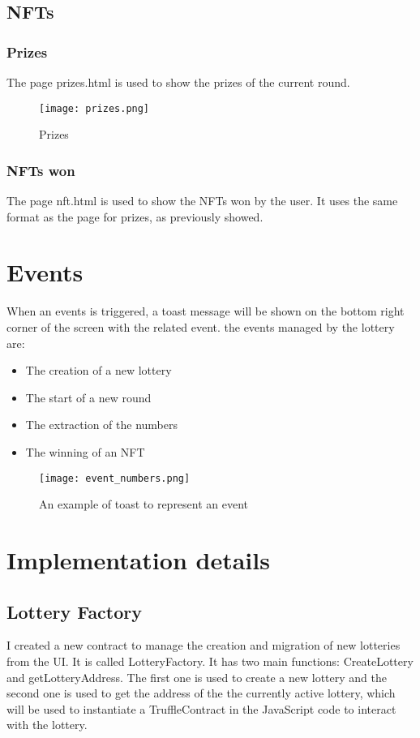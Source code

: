 \documentclass[11pt]{article}
\begin{document}
\subsection{NFTs}
\subsubsection*{Prizes}
The page prizes.html is used to show the prizes of the current round.
\begin{figure}[h!]
\centering
\texttt{[image: prizes.png]}
\caption{Prizes}
\label{fig:prizes}
\end{figure}

\subsubsection*{NFTs won}
The page nft.html is used to show the NFTs won by the user. It uses the
same format as the page for prizes, as previously showed.
\section{Events}
When an events is triggered, a toast message will be shown on the bottom right corner of the screen
with the related event.
the events managed by the lottery are:
\begin{itemize}
\item The creation of a new lottery
\item The start of a new round
\item The extraction of the numbers
\item The winning of an NFT
\end{itemize}
\begin{figure}[h!]
\centering
\texttt{[image: event\_numbers.png]}
\caption{An example of toast to represent an event}
\label{fig:events}

\end{figure}


\section{Implementation details}
\subsection{Lottery Factory}
I created a new contract to manage the creation and migration of new lotteries from the
UI. It is called LotteryFactory. It has two main functions: CreateLottery and getLotteryAddress.
The first one is used to create a new lottery and the second one is used to get the address of the
the currently active lottery, which will be used to instantiate a TruffleContract in the JavaScript
code to interact with the lottery.
\end{document}
